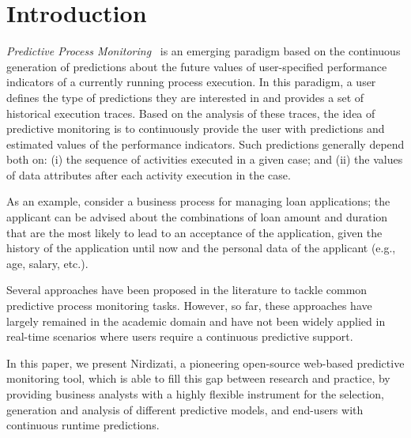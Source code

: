 \documentclass[runningheads,a4paper]{llncs}
\begin{document}
\section{Introduction} \label{sec:intro}
\emph{Predictive Process Monitoring}~\cite{PredictiveMonitoring} is an emerging paradigm based on the continuous generation of predictions about the future values of user-specified performance indicators of a currently running process execution.
In this paradigm, a user defines the type of predictions they are interested in and provides a set of historical execution traces. Based on the analysis of these traces, the idea of predictive monitoring is to continuously provide the user with predictions and estimated values of the performance indicators. Such predictions generally depend both on: (i) the sequence of activities executed in a given case; and (ii) the values of data attributes after each activity execution in the case.

As an example, consider a business process for managing loan applications; the applicant can be advised about the combinations of loan amount and duration that are the most likely to lead to an acceptance of the application, given the history of the application until now and the personal data of the applicant (e.g., age, salary, etc.).

Several approaches have been proposed in the literature to tackle common predictive process monitoring tasks.
However, so far, these approaches have largely remained in the academic domain and
have not been widely applied in real-time scenarios where users require a continuous predictive support.

In this paper, we present Nirdizati, a pioneering open-source web-based predictive monitoring tool, which is able to fill this gap
between research and practice, by providing business analysts with a highly flexible instrument for the selection,
generation and analysis of different predictive models, and end-users with continuous runtime predictions.
\end{document}
